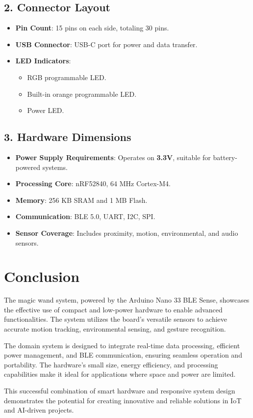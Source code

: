 	\subsection*{2. Connector Layout}
	\begin{itemize}
		\item \textbf{Pin Count}: 15 pins on each side, totaling 30 pins.
		\item \textbf{USB Connector}: USB-C port for power and data transfer.
		\item \textbf{LED Indicators}:
		\begin{itemize}
			\item RGB programmable LED.
			\item Built-in orange programmable LED.
			\item Power LED.
		\end{itemize}
	\end{itemize}
	
	\subsection*{3. Hardware Dimensions}
	\begin{itemize}
		\item \textbf{Power Supply Requirements}: Operates on \textbf{3.3V}, suitable for battery-powered systems.
		\item \textbf{Processing Core}: nRF52840, 64 MHz Cortex-M4.
		\item \textbf{Memory}: 256 KB SRAM and 1 MB Flash.
		\item \textbf{Communication}: BLE 5.0, UART, I2C, SPI.
		\item \textbf{Sensor Coverage}: Includes proximity, motion, environmental, and audio sensors.
	\end{itemize}

\section{Conclusion}
	The magic wand system, powered by the Arduino Nano 33 BLE Sense, showcases the effective use of compact and low-power hardware to enable advanced functionalities. The system utilizes the board's versatile sensors to achieve accurate motion tracking, environmental sensing, and gesture recognition.\cite{Passaro:2017}
	
	The domain system is designed to integrate real-time data processing, efficient power management, and BLE communication, ensuring seamless operation and portability. The hardware's small size, energy efficiency, and processing capabilities make it ideal for applications where space and power are limited.\cite{Passaro:2017}
	
	This successful combination of smart hardware and responsive system design demonstrates the potential for creating innovative and reliable solutions in IoT and AI-driven projects.\cite{Passaro:2017}









